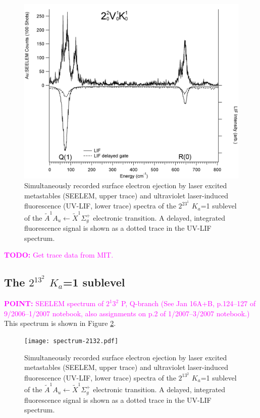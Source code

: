 \documentclass[12pt,draft]{mitthesis}
\newcommand{\TODO} [1]{\textcolor{magenta}{\textbf{TODO:} #1}}
\newcommand{\POINT}[1]{\textcolor{magenta}{\textbf{POINT:} #1}}
\begin{document}
\begin{figure}
  \caption{
    Simultaneously recorded surface electron ejection by laser excited
    metastables (SEELEM, upper trace) and ultraviolet laser-induced
    fluorescence (UV-LIF, lower trace) spectra of the $2^23^1$ $K_a$=1
    sublevel of the $\tilde{A}^1A_u \leftarrow \tilde{X} ^1\Sigma_g^+$
    electronic transition. A delayed, integrated fluorescence signal
    is shown as a dotted trace in the UV-LIF spectrum.}
  \label{fig:spectrum-2231-q1r0}
  \centering
  \includegraphics[width=6in]{spectrum-2231-Q1R0.png}
\end{figure}

\TODO{Get trace data from MIT.}

\subsection{The $2^13^2$ $K_a$=1 sublevel}

\POINT{SEELEM spectrum of $2^1 3^2$ P, Q-branch (See Jan 16A+B,
  p.124--127 of 9/2006--1/2007 notebook, also assignments on p.2 of
  1/2007--3/2007 notebook.)}  This spectrum is shown in Figure
\ref{fig:spectrum-2132}.

\begin{figure}
  \caption{
    Simultaneously recorded surface electron ejection by laser excited
    metastables (SEELEM, upper trace) and ultraviolet laser-induced
    fluorescence (UV-LIF, lower trace) spectra of the $2^13^2$ $K_a$=1
    sublevel of the $\tilde{A}^1A_u \leftarrow \tilde{X} ^1\Sigma_g^+$
    electronic transition. A delayed, integrated fluorescence signal
    is shown as a dotted trace in the UV-LIF spectrum.}
  \label{fig:spectrum-2132}
  \centering
  \texttt{[image: spectrum-2132.pdf]}
\end{figure}
\end{document}
